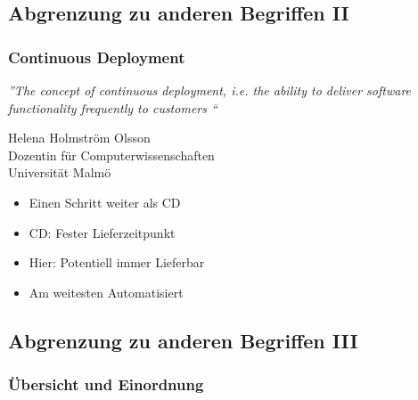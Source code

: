 \documentclass[hyperref={pdfpagelabels=false}]{beamer}
\begin{document}
\subsection{Abgrenzung zu anderen Begriffen II}
\begin{frame} [t]
\frametitle{Continuous Deployment}
 {
\begin{center}
\textit{”The concept of continuous deployment, i.e. the ability to deliver software functionality frequently to customers \textelp{}“}
\end{center}
\vspace{0.5cm} 
\begin{flushright}
\footnotesize{Helena Holmström Olsson\\ Dozentin für Computerwissenschaften\\ Universität Malmö}
\end{flushright}
}
 {
\vspace{0.5cm} 
\begin{multicols}{2}
\begin{itemize}
	\item Einen Schritt weiter als CD
	\item CD: Fester Lieferzeitpunkt
	\item Hier: Potentiell immer Lieferbar 
	\item Am weitesten Automatisiert
\end{itemize}
\end{multicols}
}
\end{frame}

\subsection{Abgrenzung zu anderen Begriffen III}
\begin{frame} [t]
\frametitle{Übersicht und Einordnung}
\begin{figure}[h]
  \centering
\end{figure}
\end{frame}
\end{document}
